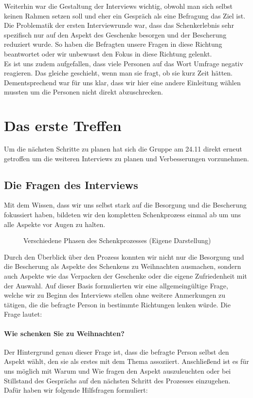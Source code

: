 \documentclass[12pt,ngerman, fleqn]{book} %
\begin{document}
Weiterhin war die Gestaltung der Interviews wichtig, obwohl man sich selbst keinen Rahmen setzen soll und eher ein Gespräch als eine Befragung das Ziel ist. Die Problematik der ersten Interviewrunde war, dass das Schenkerlebnis sehr spezifisch nur auf den Aspekt des Geschenke besorgen und der Bescherung reduziert wurde. So haben die Befragten unsere Fragen in diese Richtung beantwortet oder wir unbewusst den Fokus in diese Richtung gelenkt.\\

Es ist uns zudem aufgefallen, dass viele Personen auf das Wort Umfrage negativ reagieren. Das gleiche geschieht, wenn man sie fragt, ob sie kurz Zeit hätten. Dementsprechend war für uns klar, dass wir hier eine andere Einleitung wählen mussten um die Personen nicht direkt abzuschrecken.

\section{Das erste Treffen}
Um die nächsten Schritte zu planen hat sich die Gruppe am 24.11 direkt erneut getroffen um die weiteren Interviews zu planen und Verbesserungen vorzunehmen.

\subsection{Die Fragen des Interviews}
Mit dem Wissen, dass wir uns selbst stark auf die Besorgung und die Bescherung fokussiert haben, bildeten wir den kompletten Schenkprozess einmal ab um uns alle Aspekte vor Augen zu halten.\\

\begin{figure}[ht]
    \centering
    \caption{Verschiedene Phasen des Schenkprozesses (Eigene Darstellung)}
    \label{fig:prozess}
\end{figure}

Durch den Überblick über den Prozess konnten wir nicht nur die Besorgung und die Bescherung als Aspekte des Schenkens zu Weihnachten ausmachen, sondern auch Aspekte wie das Verpacken der Geschenke oder die eigene Zufriedenheit mit der Auswahl. Auf dieser Basis formulierten wir eine allgemeingültige Frage, welche wir zu Beginn des Interviews stellen ohne weitere Anmerkungen zu tätigen, die die befragte Person in bestimmte Richtungen lenken würde. Die Frage lautet:

\paragraph{Wie schenken Sie zu Weihnachten?}
Der Hintergrund genau dieser Frage ist, dass die befragte Person selbst den Aspekt wählt, den sie als erstes mit dem Thema assoziiert. Anschließend ist es für uns möglich mit Warum und Wie fragen den Aspekt auszuleuchten oder bei Stillstand des Gesprächs auf den nächsten Schritt des Prozesses einzugehen. Dafür haben wir folgende Hilfsfragen formuliert:
\end{document}
